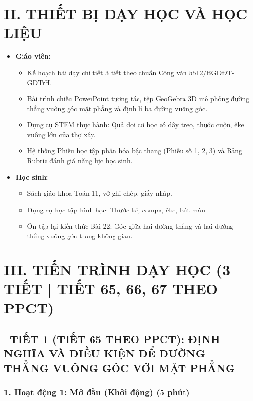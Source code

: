 \documentclass[12pt, a4paper]{article}
\begin{document}
\vspace{5pt}

\section*{II. THIẾT BỊ DẠY HỌC VÀ HỌC LIỆU}

\begin{itemize}[leftmargin=1.2cm]
    \item \textbf{Giáo viên:}
    \begin{itemize}[leftmargin=0.6cm]
        \item Kế hoạch bài dạy chi tiết 3 tiết theo chuẩn Công văn 5512/BGDĐT-GDTrH.
        \item Bài trình chiếu PowerPoint tương tác, tệp GeoGebra 3D mô phỏng đường thẳng vuông góc mặt phẳng và định lí ba đường vuông góc.
        \item Dụng cụ STEM thực hành: Quả dọi cơ học có dây treo, thước cuộn, êke vuông lớn của thợ xây.
        \item Hệ thống Phiếu học tập phân hóa bậc thang (Phiếu số 1, 2, 3) và Bảng Rubric đánh giá năng lực học sinh.
    \end{itemize}
    \item \textbf{Học sinh:}
    \begin{itemize}[leftmargin=0.6cm]
        \item Sách giáo khoa Toán 11, vở ghi chép, giấy nháp.
        \item Dụng cụ học tập hình học: Thước kẻ, compa, êke, bút màu.
        \item Ôn tập lại kiến thức Bài 22: Góc giữa hai đường thẳng và hai đường thẳng vuông góc trong không gian.
    \end{itemize}
\end{itemize}

\vspace{5pt}

\section*{III. TIẾN TRÌNH DẠY HỌC (3 TIẾT | TIẾT 65, 66, 67 THEO PPCT)}

\subsection*{\faClockO \ TIẾT 1 (TIẾT 65 THEO PPCT): ĐỊNH NGHĨA VÀ ĐIỀU KIỆN ĐỂ ĐƯỜNG THẲNG VUÔNG GÓC VỚI MẶT PHẲNG}

\subsubsection*{1. Hoạt động 1: Mở đầu (Khởi động) (5 phút)}
\end{document}
